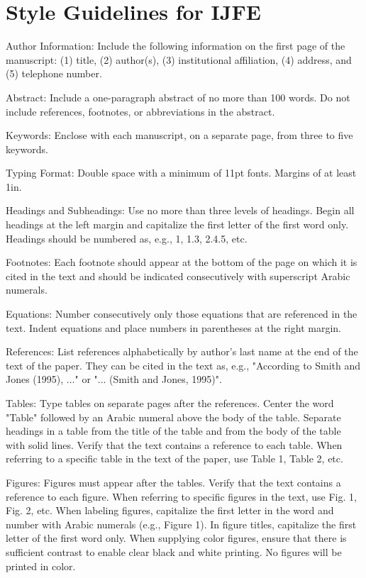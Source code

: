 \documentclass{ws-ijm}
\begin{document}
\section{Style Guidelines for IJFE}


Author Information: Include the following information on the first page of the manuscript: (1) title, (2) author(s), (3) institutional affiliation, (4) address, and (5) telephone number.

Abstract: Include a one-paragraph abstract of no more than 100 words. Do not include references, footnotes, or abbreviations in the abstract.

Keywords: Enclose with each manuscript, on a separate page, from three to five keywords.

Typing Format: Double space with a minimum of 11pt fonts. Margins of at least 1in.

Headings and Subheadings: Use no more than three levels of headings. Begin all headings at the left margin and capitalize the first letter of the first word only. Headings should be numbered as, e.g., 1, 1.3, 2.4.5, etc.

Footnotes: Each footnote should appear at the bottom of the page on which it is cited in the text and should be indicated consecutively with superscript Arabic numerals.

Equations: Number consecutively only those equations that are referenced in the text. Indent equations and place numbers in parentheses at the right margin.

References: List references alphabetically by author's last name at the end of the text of the paper. They can be cited in the text as, e.g., "According to Smith and Jones (1995), ..." or "... (Smith and Jones, 1995)".

Tables: Type tables on separate pages after the references. Center the word "Table" followed by an Arabic numeral above the body of the table. Separate headings in a table from the title of the table and from the body of the table with solid lines. Verify that the text contains a reference to each table. When referring to a specific table in the text of the paper, use Table 1, Table 2, etc.

Figures: Figures must appear after the tables. Verify that the text contains a reference to each figure. When referring to specific figures in the text, use Fig. 1, Fig. 2, etc. When labeling figures, capitalize the first letter in the word and number with Arabic numerals (e.g., Figure 1). In figure titles, capitalize the first letter of the first word only. When supplying color figures, ensure that there is sufficient contrast to enable clear black and white printing. No figures will be printed in color.
\end{document}

